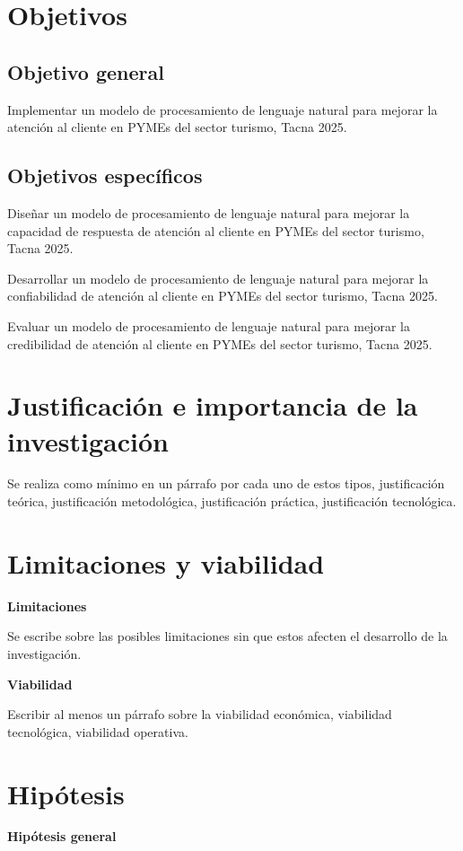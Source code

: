 \section{Objetivos}
\subsection{Objetivo general}
Implementar un modelo de procesamiento de lenguaje natural para mejorar la atención al cliente en PYMEs del sector turismo, Tacna 2025.

\subsection{Objetivos específicos}
Diseñar un modelo de procesamiento de lenguaje natural para mejorar la capacidad de respuesta de atención al cliente en PYMEs del sector turismo, Tacna 2025.

Desarrollar un modelo de procesamiento de lenguaje natural para mejorar la confiabilidad de atención al cliente en PYMEs del sector turismo, Tacna 2025.

Evaluar un modelo de procesamiento de lenguaje natural para mejorar la credibilidad de atención al cliente en PYMEs del sector turismo, Tacna 2025.

\section{Justificación e importancia de la investigación}
Se realiza como mínimo en un párrafo por cada uno de estos tipos, justificación teórica, justificación metodológica, justificación práctica, justificación tecnológica.

\section{Limitaciones y viabilidad}
\textbf{Limitaciones}

Se escribe sobre las posibles limitaciones sin que estos afecten el desarrollo de la investigación.

\textbf{Viabilidad}

Escribir al menos un párrafo sobre la viabilidad económica, viabilidad tecnológica, viabilidad operativa.

\section{Hipótesis}
\textbf{Hipótesis general}


